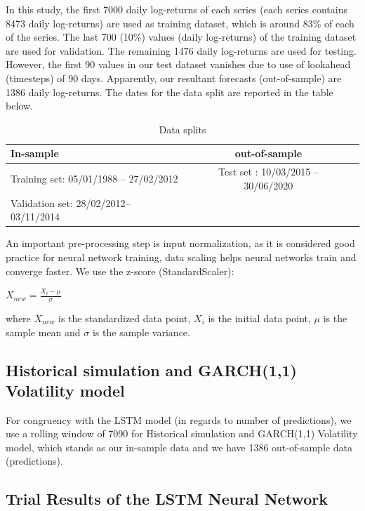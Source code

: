 \documentclass[a4paper,11pt,oneside]{book}
\begin{document}
In this study, the first 7000 daily log-returns of each series (each series contains 8473 daily log-returns) are used as training dataset, which is around 83\% of each of the series. The last 700 (10\%) values (daily log-returns) of the training dataset are used for validation. The remaining 1476 daily log-returns are used for testing. However, the first 90 values in our test dataset vanishes due to use of lookahead (timesteps) of 90 days. Apparently, our resultant forecasts (out-of-sample) are 1386 daily log-returns. The dates for the data split are reported in the table below.
\newline\newline
\begin{table}[!h]
	\centering
	\begin{tabular}{l|cl}
		\hline \hline
		In-sample
		& out-of-sample\\ \hline
		Training set: 05/01/1988 – 27/02/2012
		& Test set
		: 10/03/2015 – 30/06/2020
	 \\
		Validation set: 28/02/2012– 03/11/2014
		\\
		\hline \hline
	\end{tabular}
	\caption{Data splits}
	\label{firsttab}
\end{table}

An important pre-processing step is input normalization, as it is considered good practice for neural network training, data scaling helps neural networks train and converge faster. We use the z-score (StandardScaler): 

\begin{center}
	$X_{new} = \frac{X_{i}-\mu}{\sigma}$
\end{center}

where $X_{new}$ is the standardized data point, $X_{i}$ is the initial data point, $\mu$ is the sample mean and $\sigma$ is the sample variance.


\subsection{Historical simulation and GARCH(1,1) Volatility model}
For congruency with the LSTM model (in regards to number of predictions), we use a rolling window of 7090 for Historical simulation and GARCH(1,1) Volatility model, which stands as our in-sample data and we have 1386 out-of-sample data (predictions).

\subsection{Trial Results of the LSTM Neural Network}
\end{document}
